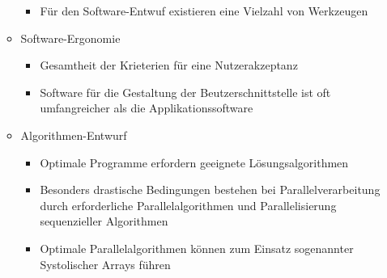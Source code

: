 \begin{itemize}
\begin{itemize}
\begin{itemize}
			\item Für den Software-Entwuf existieren eine Vielzahl von Werkzeugen
		\end{itemize}
		\item Software-Ergonomie
		\begin{itemize}
			\item Gesamtheit der Krieterien für eine Nutzerakzeptanz
			\item Software für die Gestaltung der Beutzerschnittstelle ist oft umfangreicher als die Applikationssoftware
		\end{itemize}
		\item Algorithmen-Entwurf
		\begin{itemize}
			\item Optimale Programme erfordern geeignete Lösungsalgorithmen
			\item Besonders drastische Bedingungen bestehen bei Parallelverarbeitung durch erforderliche Parallelalgorithmen und Parallelisierung sequenzieller Algorithmen
			\item Optimale Parallelalgorithmen können zum Einsatz sogenannter Systolischer Arrays führen
		\end{itemize}
	\end{itemize}
\end{itemize}

